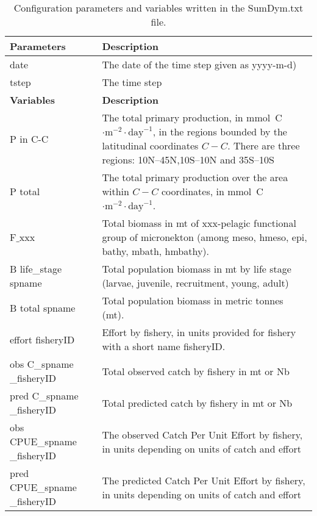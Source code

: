 \begin{table}[H]
\caption{Configuration parameters and variables written in the {\ttfamily SumDym.txt} file.}
\raggedleft
\begin{tabular}{p{4cm}p{11.75cm}}
    \hline
    {\bfseries Parameters} & {\bfseries Description}\\ \hline\hline
    {\ttfamily date} & The date of the time step given as {\ttfamily yyyy-m-d}) \\ \hline
    {\ttfamily tstep} & The time step \\
    \hline
    {\bfseries Variables} & {\bfseries Description}\\ \hline\hline
    {\ttfamily P in C-C}  & The total primary production, in mmol~C$\cdot\text{m}^{-2} \cdot\text{day}^{-1}$, in the regions bounded by the latitudinal coordinates $C-C$. There are three regions: 10N--45N,10S--10N  and 35S--10S \\\hline
    {\ttfamily P total}  & The total primary production over the area within $C-C$ coordinates, in  mmol~C$\cdot\text{m}^{-2} \cdot\text{day}^{-1}$.\\\hline
    {\ttfamily F$\_$xxx}  & Total biomass in mt of xxx-pelagic functional group of micronekton (among meso, hmeso, epi, bathy, mbath, hmbathy). \\ \hline
    {\ttfamily B life\_stage} {\ttfamily  spname}  & Total population biomass in mt by life stage (larvae, juvenile, recruitment, young, adult)\\ \hline
    {\ttfamily B total} {\ttfamily spname}  & Total population biomass in metric tonnes (mt).\\ \hline
    {\ttfamily effort} {\ttfamily fisheryID} & Effort by fishery, in units provided for fishery with a short name {\ttfamily fisheryID}. \\ \hline
    {\ttfamily obs C\_spname} {\ttfamily \_fisheryID} & Total observed catch by fishery in mt or Nb\\ \hline
    {\ttfamily pred C\_spname} {\ttfamily \_fisheryID} & Total predicted catch by fishery in mt or Nb\\ \hline
    {\ttfamily obs CPUE\_spname} {\ttfamily \_fisheryID} & The observed Catch Per Unit Effort by fishery, in units depending on units of catch and effort\\ \hline
    {\ttfamily pred CPUE\_spname} {\ttfamily \_fisheryID} & The predicted Catch Per Unit Effort by fishery, in units depending on units of catch and effort\\
    \hline
\end{tabular}
\label{tab:variables_sumdym}
\end{table}

